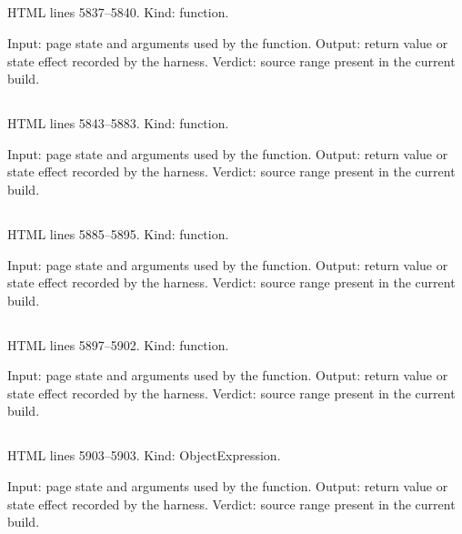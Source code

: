 \subsection*{\texttt{}}
\label{vf_267_ccSetpoints}
HTML lines 5837--5840. Kind: function.

Input: page state and arguments used by the function.
Output: return value or state effect recorded by the harness.
Verdict: source range present in the current build.

\subsection*{\texttt{}}
\label{vf_268_ccQsLog}
HTML lines 5843--5883. Kind: function.

Input: page state and arguments used by the function.
Output: return value or state effect recorded by the harness.
Verdict: source range present in the current build.

\subsection*{\texttt{}}
\label{vf_269_ccCalibSummary}
HTML lines 5885--5895. Kind: function.

Input: page state and arguments used by the function.
Output: return value or state effect recorded by the harness.
Verdict: source range present in the current build.

\subsection*{\texttt{}}
\label{vf_270_ccQuantSaturation}
HTML lines 5897--5902. Kind: function.

Input: page state and arguments used by the function.
Output: return value or state effect recorded by the harness.
Verdict: source range present in the current build.

\subsection*{\texttt{}}
\label{vf_271_CC_TZ}
HTML lines 5903--5903. Kind: ObjectExpression.

Input: page state and arguments used by the function.
Output: return value or state effect recorded by the harness.
Verdict: source range present in the current build.

